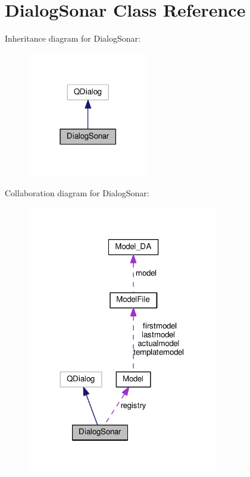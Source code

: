 \section{Dialog\+Sonar Class Reference}
\label{class_dialog_sonar}


Inheritance diagram for Dialog\+Sonar\+:\nopagebreak
\begin{figure}[H]
\begin{center}
\leavevmode
\includegraphics[width=150pt]{class_dialog_sonar__inherit__graph}
\end{center}
\end{figure}


Collaboration diagram for Dialog\+Sonar\+:\nopagebreak
\begin{figure}[H]
\begin{center}
\leavevmode
\includegraphics[width=236pt]{class_dialog_sonar__coll__graph}
\end{center}
\end{figure}
